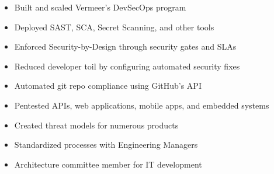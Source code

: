 \documentclass[../../../main.tex]{subfiles}
\begin{document}
\begin{itemize}
    \item Built and scaled Vermeer's DevSecOps program
    \item Deployed SAST, SCA, Secret Scanning, and other tools
    \item Enforced Security-by-Design through security gates and SLAs
    \item Reduced developer toil by configuring automated security fixes
    \item Automated git repo compliance using GitHub's API
    \item Pentested APIs, web applications, mobile apps, and embedded systems
    \item Created threat models for numerous products
    \item Standardized processes with Engineering Managers
    \item Architecture committee member for IT development
\end{itemize}
\end{document}
